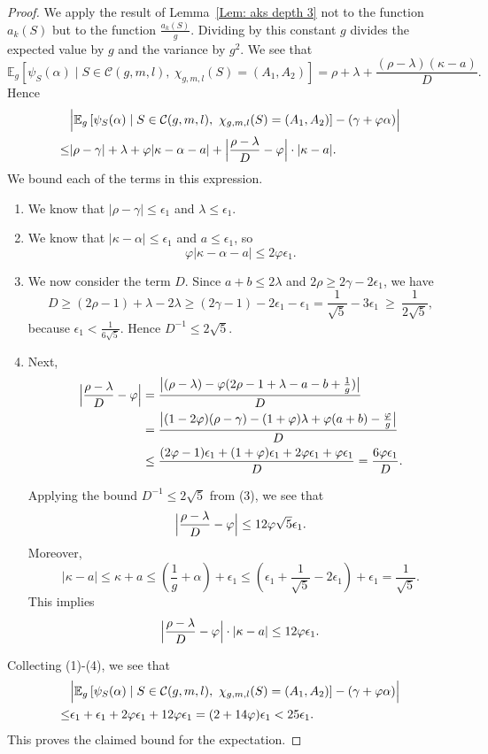 \documentclass[12pt]{amsart}
\def\E{{\mathbb E}}
\renewcommand{\phi}{\varphi}
\newcommand{\cC}{\mathcal{C}}
\begin{document}
\begin{proof}
We apply the result of Lemma~\ref{Lem: aks depth 3} not to the function $a_k(S)$ but to the function $\frac{a_k(S)}{g}$.  Dividing by this constant $g$ divides the expected value by $g$ and the variance by $g^2$.  We see that
\[
\E_g\left[\psi_S(\alpha)\mid S\in \cC(g,m,l),\ \chi_{g,m,l}(S)=(A_1,A_2)\right]
= \rho+\lambda+\frac{(\rho-\lambda)(\kappa-a)}{D}.
\]
Hence
\begin{align*}
& \Bigl| \E_g\left[\psi_S(\alpha)\mid S\in \cC(g,m,l),\ \chi_{g,m,l}(S)=(A_1,A_2)\right]-(\gamma+\phi\alpha)\Bigr| \\
\leq & |\rho-\gamma|+\lambda+\phi|\kappa-\alpha-a|
   +\Bigl|\frac{\rho-\lambda}{D}-\phi\Bigr|\cdot|\kappa-a|.
\end{align*}
We bound each of the terms in this expression.
\begin{enumerate}
    \item We know that $|\rho-\gamma|\leq \epsilon_1$ and $\lambda\leq \epsilon_1$.
    \item We know that $|\kappa-\alpha|\leq \epsilon_1$ and $a\leq \epsilon_1$, so
    \[
    \phi|\kappa-\alpha-a|\leq 2\phi\epsilon_1.
    \]
    \item We now consider the term $D$.  Since $a+b \le 2\lambda$ and $2\rho \ge 2\gamma - 2\epsilon_1$, we have
    \[
    D\geq (2\rho-1)+\lambda-2\lambda\geq (2\gamma-1)-2\epsilon_1-\epsilon_1
    = \frac1{\sqrt5}-3\epsilon_1 \ \ge\ \frac1{2\sqrt5},
    \]
    because $\epsilon_1<\frac{1}{6\sqrt5}$. Hence $D^{-1}\leq 2\sqrt5$.
    \item Next,
    \begin{align*}
    \Bigl|\frac{\rho-\lambda}{D}-\phi\Bigr|
    &=\frac{\big|(\rho-\lambda)-\phi(2\rho-1+\lambda-a-b+\tfrac1g)\big|}{D}\\
    &=\frac{\big|(1-2\phi)(\rho-\gamma)-(1+\phi)\lambda+\phi(a+b)-\tfrac{\phi}{g}\big|}{D}\\
    &\leq \frac{(2\phi-1)\epsilon_1 +(1+\phi)\epsilon_1 +2\phi\epsilon_1+\phi\epsilon_1}{D}
    = \frac{6\phi\epsilon_1}{D}.
    \end{align*}

Applying the bound $D^{-1}\leq 2\sqrt5$ from (3), we see that
    \[
    \Bigl|\frac{\rho-\lambda}{D}-\phi\Bigr|\leq 12\phi\sqrt{5}\epsilon_1.
    \]
    Moreover,
    \[
    |\kappa-a|\leq \kappa +a 
    \leq \left(\frac{1}{g}+\alpha\right) +\epsilon_1 
    \leq \left(\epsilon_1 +\frac1{\sqrt5}-2\epsilon_1\right)+\epsilon_1
    = \frac1{\sqrt5}.
    \]
    This implies
    \[    
    \Bigl|\frac{\rho-\lambda}{D}-\phi\Bigr|\cdot|\kappa-a|
    \leq 12\phi\epsilon_1.
    \]
\end{enumerate}
Collecting (1)-(4), we see that
\begin{align*}
& \Bigl| \E_g\left[\psi_S(\alpha)\mid S\in \cC(g,m,l),\ \chi_{g,m,l}(S)=(A_1,A_2)\right]-(\gamma+\phi\alpha)\Bigr| \\
 \leq & \epsilon_1+\epsilon_1+2\phi\epsilon_1+12\phi \epsilon_1
= (2+14\phi)\epsilon_1 <25\epsilon_1.
\end{align*}
This proves the claimed bound for the expectation.




\end{proof}
\end{document}
